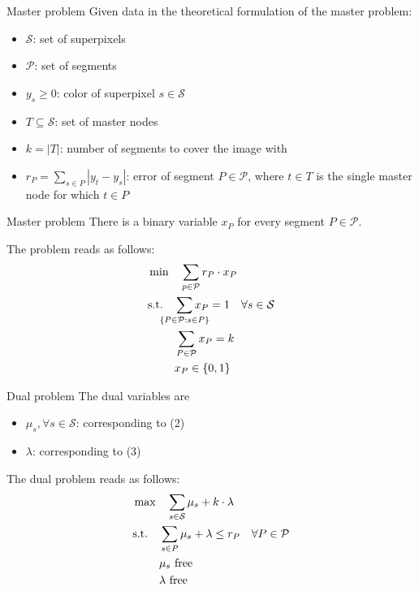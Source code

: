 \documentclass[fleqn]{beamer}
\newcommand{\superpixels}{\mathcal{S}}
\newcommand{\segments}{\mathcal{P}}
\begin{document}
    \begin{frame}{Master problem}
        Given data in the theoretical formulation of the master problem:
        \begin{itemize}
            \item $\superpixels$: set of superpixels
            \item $\segments$: set of segments %
            \item $y_s\geq0$: color of superpixel $s\in\superpixels$
            \item $T\subseteq\superpixels$: set of master nodes %
            \item $k=|T|$: number of segments to cover the image with
            \item $r_P=\sum_{s\in P}|y_t-y_s|$: error of segment $P\in\segments$,
            where $t\in T$ is the single master node for which $t\in P$
        \end{itemize}
    \end{frame}
	
	\begin{frame}{Master problem}
		There is a binary variable $x_P$ for every segment $P\in\segments$.
        
		The problem reads as follows:
		\begin{align}
    		&\min\quad \sum_{p\in\mathcal{P}} r_P\cdot x_P\\
		    &\text{s.t.}\quad \smashoperator{\sum_{\{P\in\mathcal{P}:s\in P\}}} x_P = 1 \quad\forall s\in\superpixels \\
		    &\phantom{\text{s.t.}\quad} \sum_{P\in\mathcal{P}} x_P = k \\
		    &\phantom{\text{s.t.}\quad} x_P \in \{0,1\}
		\end{align}
	\end{frame}
	
	\begin{frame}{Dual problem}
		The dual variables are
		\begin{itemize}
			\item $\mu_s, \forall s\in\superpixels$: corresponding to (2)
			\item $\lambda$: corresponding to (3)
		\end{itemize}
		
		The dual problem reads as follows:
		\begin{align}
		    &\max\quad \smashoperator{\sum_{s\in\superpixels}} \mu_s + k\cdot\lambda \\
		    &\text{s.t.}\quad \sum_{s\in P} \mu_s + \lambda \leq r_P \quad\forall P\in\mathcal{P} \\
		    &\phantom{\text{s.t.}\quad} \mu_s \text{ free} \\
		    &\phantom{\text{s.t.}\quad} \lambda \text{ free}
		\end{align}
	\end{frame}
	
\end{document}
